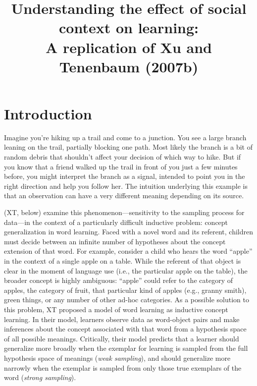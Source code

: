 \documentclass[man]{apa2}
\title{Understanding the effect of social context on learning: \\ A replication of Xu and Tenenbaum (2007b)}
\begin{document}
\maketitle       

\section{Introduction}

Imagine you're hiking up a trail and come to a junction. You see a large branch leaning on the trail, partially blocking one path. Most likely the branch is a bit of random debris that shouldn't affect your decision of which way to hike. But if you know that a friend walked up the trail in front of you just a few minutes before, you might interpret the branch as a signal, intended to point you in the right direction and help you follow her. The intuition underlying this example is that an observation can have a very different meaning depending on its source.

 (XT, below) examine this phenomenon---sensitivity to the sampling process for data---in the context of a particularly difficult inductive problem: concept generalization in word learning. Faced with a novel word and its referent, children must decide between an infinite number of hypotheses about the concept extension of that word. For example, consider a child who hears the word ``apple'' in the context of a single apple on a table. While the referent of that object is clear in the moment of language use (i.e., the particular apple on the table), the broader concept is highly ambiguous: ``apple'' could refer to the category of apples, the category of fruit, that particular kind of apples (e.g., granny smith), green things, or any number of other ad-hoc categories. As a possible solution to this problem, XT proposed a model of word learning as inductive concept learning. In their model, learners observe data as word-object pairs and make inferences about the concept associated with that word from a hypothesis space of all possible meanings. Critically, their model predicts that a learner should generalize more broadly when the exemplar for learning is sampled from the full hypothesis space of meanings ({\it weak sampling}), and should generalize more narrowly when the exemplar is sampled from only those true exemplars of the word ({\it strong sampling}). 
\end{document}
